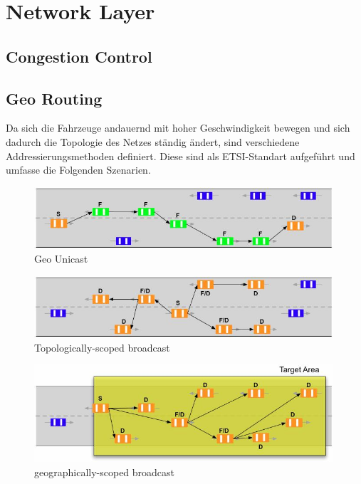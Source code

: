 \chapter{Network Layer\label{chap:networklayer}}
\section{Congestion Control\label{sec:congestioncontrol}}
\section{Geo Routing\label{sec:georouting}}
Da sich die Fahrzeuge andauernd mit hoher Geschwindigkeit bewegen und sich dadurch die Topologie des Netzes ständig ändert, sind verschiedene Addressierungsmethoden definiert. Diese sind als ETSI-Standart aufgeführt und umfasse die Folgenden Szenarien. 

\begin{figure}
\includegraphics[width=0.99\textwidth]{content/images/03_networklayer/GeoUnicast.jpg}
\caption{Geo Unicast \cite{etsi102636-1}}
\label{fig:geounicast}
\end{figure}

\begin{figure}
\includegraphics[width=0.99\textwidth]{content/images/03_networklayer/TSC.jpg}
\caption{Topologically-scoped broadcast \cite{etsi102636-1}}
\label{fig:tsc}
\end{figure}

\begin{figure}
\includegraphics[width=0.99\textwidth]{content/images/03_networklayer/GSB.jpg}
\caption{geographically-scoped broadcast \cite{etsi102636-1}}
\label{fig:gsb}
\end{figure}
